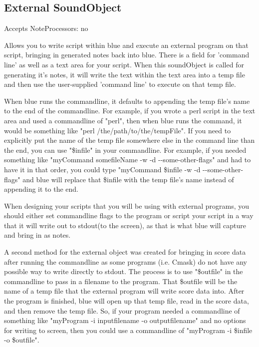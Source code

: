 \subsection{External SoundObject}\label{externalSoundObject}

Accepts NoteProcessors: no

Allows you to write script within blue and execute an external program
on that script, bringing in generated notes back into blue. There is a
field for 'command line' as well as a text area for your script. When
this soundObject is called for generating it's notes, it will write the
text within the text area into a temp file and then use the
user-supplied 'command line' to execute on that temp file.

When blue runs the commandline, it defaults to appending the temp file's
name to the end of the commandline. For example, if you wrote a perl
script in the text area and used a commandline of "perl", then when blue
runs the command, it would be something like "perl
/the/path/to/the/tempFile". If you need to explicitly put the name of
the temp file somewhere else in the command line than the end, you can
use "\$infile" in your commandline. For example, if you needed something
like "myCommand somefileName -w -d -\/-some-other-flags" and had to have
it in that order, you could type "myCommand \$infile -w -d
-\/-some-other-flags" and blue will replace that \$infile with the temp
file's name instead of appending it to the end.

When designing your scripts that you will be using with external
programs, you should either set commandline flags to the program or
script your script in a way that it will write out to stdout(to the
screen), as that is what blue will capture and bring in as notes.

A second method for the external object was created for bringing in
score data after running the commandline as some programs (i.e. Cmask)
do not have any possible way to write directly to stdout. The process is
to use "\$outfile" in the commandline to pass in a filename to the
program. That \$outfile will be the name of a temp file that the
external program will write score data into. After the program is
finished, blue will open up that temp file, read in the score data, and
then remove the temp file. So, if your program needed a commandline of
something like "myProgram -i inputfilename -o outputfilename" and no
options for writing to screen, then you could use a commandline of
"myProgram -i \$infile -o \$outfile".

